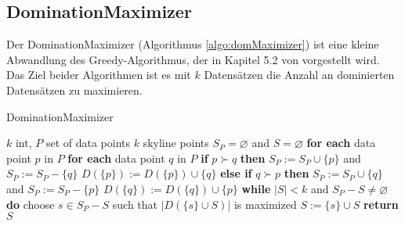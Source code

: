 \subsection{DominationMaximizer}
\label{ch:Analyse:sec:repSkyAlgos:subsec:domMax}
Der DominationMaximizer (Algorithmus \ref{algo:domMaximizer}) ist eine kleine Abwandlung des Greedy-Algorithmus, der in Kapitel 5.2 von \cite{4221657} vorgestellt wird. 
Das Ziel beider Algorithmen ist es mit $k$ Datensätzen die Anzahl an dominierten Datensätzen zu maximieren. 

\begin{algorithm}[H]
\caption{DominationMaximizer}\label{algo:domMaximizer}
\begin{algorithmic}[1]
\INPUTBF $k$ int, $P$ set of data points
\OUTPUTBF $k$ skyline points
\State $S_P = \varnothing$ and $S = \varnothing$
\State \textbf{for each} data point $p$ in $P$ 
\State \hspace{\algorithmicindent} \textbf{for each} data point $q$ in $P$
\State \hspace{\algorithmicindent} \hspace{\algorithmicindent} \textbf{if} $p \succ q$ \textbf{then} 
\State \hspace{\algorithmicindent} \hspace{\algorithmicindent} \hspace{\algorithmicindent} $S_P:= S_P \cup \{p\}$ and $S_P:= S_P-\{q\}$
\State \hspace{\algorithmicindent} \hspace{\algorithmicindent} \hspace{\algorithmicindent} $D(\{p\}):=D(\{p\}) \cup \{q\}$  
\State \hspace{\algorithmicindent} \hspace{\algorithmicindent} \textbf{else if} $q \succ p$ \textbf{then} 
\State \hspace{\algorithmicindent} \hspace{\algorithmicindent} \hspace{\algorithmicindent} $S_P:= S_P \cup \{q\}$ and $S_P:= S_P-\{p\}$  
\State \hspace{\algorithmicindent} \hspace{\algorithmicindent} \hspace{\algorithmicindent} $D(\{q\}):=D(\{q\}) \cup \{p\}$  
\State \textbf{while} $|S|<k$ and $S_P-S \neq \varnothing$ \textbf{do}
\State \hspace{\algorithmicindent} choose $s \in {S_P-S}$ such that $|D(\{s\} \cup S)|$ is maximized
\State \hspace{\algorithmicindent} $S:=\{s\} \cup S$
\State \textbf{return} $S$
\end{algorithmic}
\end{algorithm}

